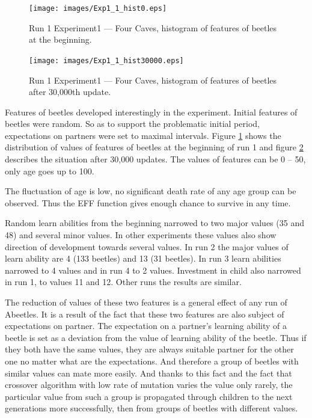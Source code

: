 \documentclass[a4paper,12pt]{report}
\begin{document}
 
\begin{figure}
\begin{center}
  \texttt{[image: images/Exp1\_1\_hist0.eps]}
  \caption{Run 1 Experiment1 --- Four Caves, histogram of features of beetles at the beginning.}
  \label{img.four_caves_run1_hist0}
\end{center}
\end{figure}

\begin{figure}
\begin{center}
  \texttt{[image: images/Exp1\_1\_hist30000.eps]}
  \caption{Run 1 Experiment1 --- Four Caves, histogram of features of beetles after 30,000th update.}
  \label{img.four_caves_run1_hist30000}
\end{center}
\end{figure}
 
Features of beetles developed interestingly in the experiment. Initial features of beetles were random. So as to support the problematic initial period, expectations on partners were set to maximal intervals. Figure \ref{img.four_caves_run1_hist0} shows the distribution of values of features of beetles at the beginning of run 1 and figure \ref{img.four_caves_run1_hist30000} describes the situation after 30,000 updates. The values of features can be 0 -- 50, only age goes up to 100.

The fluctuation of age is low, no significant death rate of any age group can be observed. Thus the EFF function gives enough chance to survive in any time.
 
Random learn abilities from the beginning narrowed to two major values (35 and 48) and several minor values. In other experiments these values also show direction of development towards several values. In run 2 the major values of learn ability are 4 (133 beetles) and 13 (31 beetles). In run 3 learn abilities narrowed to 4 values and in run 4 to 2 values.
Investment in child also narrowed in run 1, to values 11 and 12. Other runs the results are similar.

The reduction of values of these two features is a general effect of any run of Abeetles. It is a result of the fact that these two features are also subject of expectations on partner. The expectation on a partner's learning ability of a beetle is set as a deviation from the value of learning ability of the beetle. Thus if they both have the same values, they are always suitable partner for the other one no matter what are the expectations. And therefore a group of beetles with similar values can mate more easily. And thanks to this fact and the fact that crossover algorithm with low rate of mutation varies the value only rarely, the particular value from such a group is propagated through children to the next generations more successfully, then from groups of beetles with different values.
\end{document}

